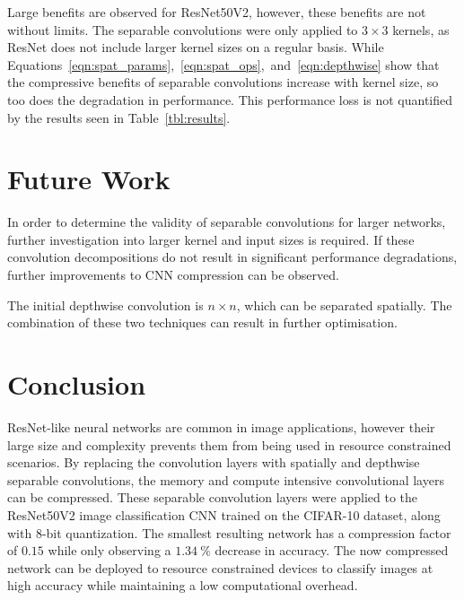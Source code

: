 \documentclass{article}
\begin{document}
	Large benefits are observed for ResNet50V2, however, these benefits are not without limits. The separable convolutions were only applied to $3 \times 3$ kernels, as ResNet does not include larger kernel sizes on a regular basis. While Equations~\ref{eqn:spat_params},~\ref{eqn:spat_ops},~and~\ref{eqn:depthwise} show that the compressive benefits of separable convolutions increase with kernel size, so too does the degradation in performance. This performance loss is not quantified by the results seen in Table~\ref{tbl:results}.
	
	\section{Future Work}
	
	In order to determine the validity of separable convolutions for larger networks, further investigation into larger kernel and input sizes is required. If these convolution decompositions do not result in significant performance degradations, further improvements to CNN compression can be observed.

	The initial depthwise convolution is $n \times n$, which can be separated spatially. The combination of these two techniques can result in further optimisation.
	
	
	\section{Conclusion}
	
	ResNet-like neural networks are common in image applications, however their large size and complexity prevents them from being used in resource constrained scenarios. By replacing the convolution layers with spatially and depthwise separable convolutions, the memory and compute intensive convolutional layers can be compressed. These separable convolution layers were applied to the ResNet50V2 image classification CNN trained on the CIFAR-10 dataset, along with 8-bit quantization. The smallest resulting network has a compression factor of $0.15$ while only observing a $1.34~\%$ decrease in accuracy. The now compressed network can be deployed to resource constrained devices to classify images at high accuracy while maintaining a low computational overhead.
	
	\newpage
	
	
	
\end{document}
